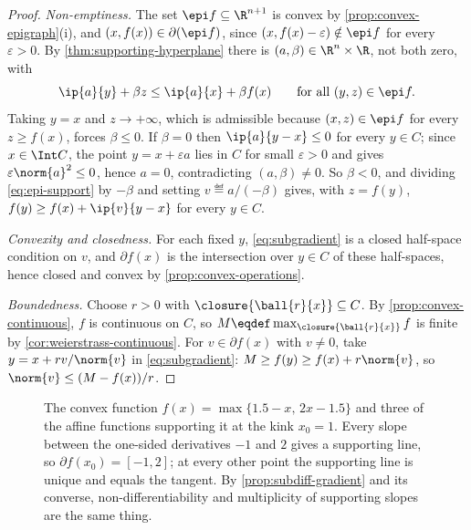 \begin{proof}
	\emph{Non-emptiness.} The set $\epi f\subseteq\R^{n+1}$ is convex by
	\autoref{prop:convex-epigraph}(i), and $(x,f(x))\in\partial(\epi f)$, since
	$(x,f(x)-\varepsilon)\notin\epi f$ for every $\varepsilon>0$. By
	\autoref{thm:supporting-hyperplane} there is
	$(a,\beta)\in\R^{n}\times\R$, not both zero, with
	\begin{equation}\label{eq:epi-support}
		\ip{a}{y}+\beta z\leq\ip{a}{x}+\beta f(x)\qquad\text{for all }(y,z)\in\epi f .
	\end{equation}
	Taking $y=x$ and $z\to+\infty$, which is admissible because
	$(x,z)\in\epi f$ for every $z\geq f(x)$, forces $\beta\leq0$. If $\beta=0$ then
	$\ip{a}{y-x}\leq0$ for every $y\in C$; since $x\in\Int C$, the point
	$y=x+\varepsilon a$ lies in $C$ for small $\varepsilon>0$ and gives
	$\varepsilon\norm{a}^2\leq0$, hence $a=0$, contradicting $(a,\beta)\neq0$. So
	$\beta<0$, and dividing \eqref{eq:epi-support} by $-\beta$ and setting
	$v\eqdef a/(-\beta)$ gives, with $z=f(y)$,
	$f(y)\geq f(x)+\ip{v}{y-x}$ for every $y\in C$.

	\emph{Convexity and closedness.} For each fixed $y$, \eqref{eq:subgradient} is a
	closed half-space condition on $v$, and $\partial f(x)$ is the intersection over
	$y\in C$ of these half-spaces, hence closed and convex by
	\autoref{prop:convex-operations}.

	\emph{Boundedness.} Choose $r>0$ with $\closure{\ball{r}{x}}\subseteq C$. By
	\autoref{prop:convex-continuous}, $f$ is continuous on $C$, so
	$M\eqdef\max_{\closure{\ball{r}{x}}}f$ is finite by
	\autoref{cor:weierstrass-continuous}. For $v\in\partial f(x)$ with $v\neq0$,
	take $y=x+rv/\norm{v}$ in \eqref{eq:subgradient}:
	$M\geq f(y)\geq f(x)+r\norm{v}$, so $\norm{v}\leq(M-f(x))/r$.
\end{proof}

\begin{figure}[htbp]
	\centering
	
	\caption[The subdifferential at a kink]{%
		The convex function $f(x)=\max\{1.5-x,\,2x-1.5\}$ and three of the affine
		functions supporting it at the kink $x_0=1$. Every slope between the
		one-sided derivatives $-1$ and $2$ gives a supporting line, so
		$\partial f(x_0)=[-1,2]$; at every other point the supporting line is unique
		and equals the tangent. By \autoref{prop:subdiff-gradient} and its converse,
		non-differentiability and multiplicity of supporting slopes are the same
		thing.}
	\label{fig:subgradient}
\end{figure}

